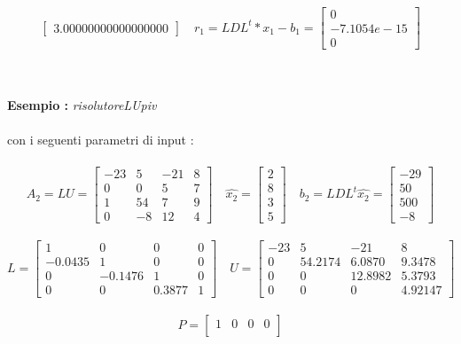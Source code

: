 \begin{description}
\[\begin{bmatrix}
			3.00000000000000000                
		\end{bmatrix} \quad
		r_1 = LDL^t*x_1-b_1 =\begin{bmatrix}
			0 \\
		  	-7.1054e-15 \\
		  	0
		\end{bmatrix}
		\]\\\\
\item \textbf{Esempio :} \textit{risolutoreLUpiv}\\\\	
	con i seguenti parametri di input :\\\	  
		\[
		A_2 = LU =\begin{bmatrix}
			-23 & 5  & -21 & 8 \\ 
			0 	& 0  & 5   & 7 \\
			1 	& 54 & 7   & 9 \\
			0 	& -8 & 12  & 4  
		\end{bmatrix} \quad
		\hat{x_2} =\begin{bmatrix}
			2 \\
			8 \\
			3 \\
			5               
		\end{bmatrix} \quad
		b_2 = LDL^t \hat{x_2} =\begin{bmatrix}
			-29 \\
			50  \\
			500 \\
			-8                
		\end{bmatrix}
		\]\\
		\[
		L =\begin{bmatrix}
			1   	&  0  		& 0 	 & 0 \\ 
			-0.0435 &  1  		& 0 	 & 0 \\
		 	0   	&  -0.1476  & 1 	 & 0 \\
		 	0   	&  0  		& 0.3877 & 1 		    
		\end{bmatrix} \quad
		U =\begin{bmatrix}
			-23 & 5 	  & -21		& 8   	   \\ 
			0 	& 54.2174 & 6.0870 	& 9.3478   \\ 
			0 	& 0 	  & 12.8982 & 5.3793   \\ 
			0 	& 0 	  & 0 		& 4.92147		
		\end{bmatrix}
		\]\\ 
		\[
		P =\begin{bmatrix}
			1 & 0 & 0 & 0 \\ 

\end{bmatrix}\]
\end{description}
